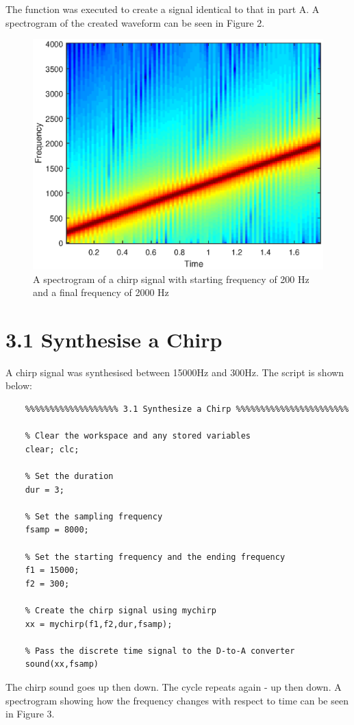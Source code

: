 \documentclass{article}
\begin{document}
The function was executed to create a signal identical to that in part A. A spectrogram of the created waveform can be seen in Figure 2.
\begin{figure}[H]
	\centering
	\includegraphics[scale=0.8]{fig2}
	\caption{A spectrogram of a chirp signal with starting frequency of 200 $\si{\hertz}$ and a final frequency of 2000 $\si{\hertz}$}
\end{figure}

\section{3.1 Synthesise a Chirp}
A chirp signal was synthesised between 15000$\si{\hertz}$ and 300$\si{\hertz}$. The script is shown below:
\begin{lstlisting}
	%%%%%%%%%%%%%%%%%%% 3.1 Synthesize a Chirp %%%%%%%%%%%%%%%%%%%%%%%
	
	% Clear the workspace and any stored variables
	clear; clc;
	
	% Set the duration
	dur = 3;
	
	% Set the sampling frequency
	fsamp = 8000;
	
	% Set the starting frequency and the ending frequency
	f1 = 15000;
	f2 = 300;
	
	% Create the chirp signal using mychirp
	xx = mychirp(f1,f2,dur,fsamp);
	
	% Pass the discrete time signal to the D-to-A converter
	sound(xx,fsamp)
\end{lstlisting}

The chirp sound goes up then down. The cycle repeats again - up then down. A spectrogram showing how the frequency changes with respect to time can be seen in Figure 3.
\end{document}

